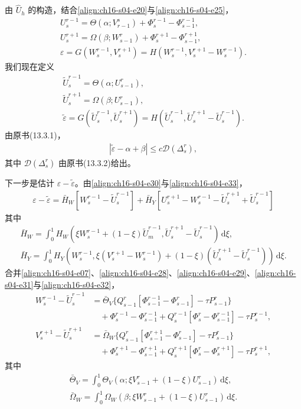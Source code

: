 ﻿\documentclass[../../main.tex]{subfiles}
\begin{document}
由 $\hat U_h$ 的构造，结合\eqref{align:ch16-s04-e20}与\eqref{align:ch16-s04-e25}，
\begin{align}
U_s^{r-1}=\Theta(\alpha;V_{r-1}^s)+\Phi_s^{r-1}-\Phi_{s-1}^{r-1},
\label{align:ch16-s04-e28}\\
U_s^{r+1}=\Omega(\beta;W_{s-1}^r)+\Phi_s^{r+1}-\Phi_{s-1}^{r+1},
\label{align:ch16-s04-e29}\\
\varepsilon=G(W_s^{r-1},V_s^{r+1})=H(W_s^{r-1},V_s^{r+1}-W_s^{r-1}).
\label{align:ch16-s04-e30}
\end{align}
我们现在定义
\begin{align}
\tilde U_s^{r-1}=\Theta(\alpha;U_{s-1}^r),
\label{align:ch16-s04-e31}\\
\tilde U_s^{r+1}=\Omega(\beta;U_{s-1}^r),
\label{align:ch16-s04-e32}\\
\tilde\varepsilon=G(\tilde U_s^{r-1},\tilde U_s^{r+1})=H(\tilde U_s^{r-1},\tilde U_s^{r+1}-\tilde U_s^{r-1}).
\label{align:ch16-s04-e33}
\end{align}
由原书(13.3.1)，
\begin{align}
|\tilde\varepsilon-\alpha+\beta|\leqslant c\mathscr{D}(\Delta_s^r),
\label{align:ch16-s04-e34}
\end{align}
其中 $\mathscr{D}(\Delta_s^r)$ 由原书(13.3.2)给出。

下一步是估计 $\varepsilon-\tilde\varepsilon$。由\eqref{align:ch16-s04-e30}与\eqref{align:ch16-s04-e33}，
\begin{align}
\varepsilon-\tilde\varepsilon=\bar H_W[W_s^{r-1}-\tilde U_s^{r-1}]+\bar H_Y[U_s^{r+1}-W_s^{r-1}-\tilde U_s^{r+1}+\tilde U_s^{r-1}]
\label{align:ch16-s04-e35}
\end{align}
其中
\begin{align}
\bar H_W=\int_0^1 H_W(\xi W_s^{r-1}+(1-\xi)\tilde U_m^{r-1},\tilde U_s^{r+1}-\tilde U_s^{r-1})\,\mathrm{d}\xi,
\label{align:ch16-s04-e36}\\
\bar H_Y=\int_0^1 H_Y(W_s^{r-1},\xi(V_s^{r+1}-W_s^{r-1})+(1-\xi)(\tilde U_s^{r+1}-\tilde U_s^{r-1}))\,\mathrm{d}\xi.
\label{align:ch16-s04-e37}
\end{align}
合并\eqref{align:ch16-s04-e07}、\eqref{align:ch16-s04-e28}、\eqref{align:ch16-s04-e29}、\eqref{align:ch16-s04-e31}与\eqref{align:ch16-s04-e32}，
\begin{align}
W_s^{r-1}-\tilde U_s^{r-1}&=\bar\Theta_V\{Q_{s-1}^r[\Phi_{s-1}^{r-1}-\Phi_{s-1}^r]-\tau P_{s-1}^r\}\nonumber\\
&\quad+\Phi_s^{r-1}-\Phi_{s-1}^{r-1}+Q_s^{r-1}[\Phi_s^r-\Phi_{s-1}^{r-1}]-\tau P_s^{r-1},
\label{align:ch16-s04-e38}\\
V_s^{r+1}-\tilde U_s^{r+1}&=\bar\Omega_W\{Q_{s-1}^r[\Phi_{s-1}^{r+1}-\Phi_{s-1}^r]-\tau P_{s-1}^r\}\nonumber\\
&\quad+\Phi_s^{r+1}-\Phi_{s-1}^{r+1}+Q_s^{r+1}[\Phi_s^r-\Phi_s^{r+1}]-\tau P_s^{r+1},
\label{align:ch16-s04-e39}
\end{align}
其中
\begin{align}
\bar\Theta_V=\int_0^1\Theta_V(\alpha;\xi V_{s-1}^r+(1-\xi)U_{s-1}^r)\,\mathrm{d}\xi,
\label{align:ch16-s04-e40}\\
\bar\Omega_W=\int_0^1\Omega_W(\beta;\xi W_{s-1}^r+(1-\xi)U_{s-1}^r)\,\mathrm{d}\xi.
\label{align:ch16-s04-e41}
\end{align}
\end{document}
